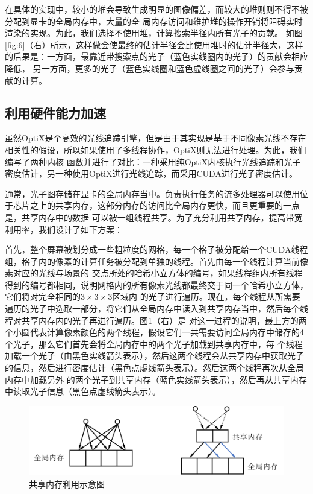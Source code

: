 \documentclass[UTF8]{ctexart}
\begin{document}
        在具体的实现中，较小的堆会导致生成明显的图像偏差，而较大的堆则则不得不被分配到显卡的全局内存中，大量的全
        局内存访问和维护堆的操作开销将阻碍实时渲染的实现。为此，我们选择不使用堆，计算搜索半径内所有光子的贡献。
        如图\ref{fig:6}（右）所示，这样做会使最终的估计半径会比使用堆时的估计半径大，这样的后果是：一方面，最靠近带搜索点的光子（蓝色实线圈内的光子）的贡献会相应降低，
        另一方面，更多的光子（蓝色实线圈和蓝色虚线圈之间的光子）会参与贡献的计算。

    \subsection{利用硬件能力加速}
        虽然OptiX是个高效的光线追踪引擎，但是由于其实现是基于不同像素光线不存在相关性的假设，所以如果使用了多线程协作，OptiX则无法进行处理。为此，我们编写了两种内核
        函数并进行了对比：一种采用纯OptiX内核执行光线追踪和光子密度估计，另一种使用OptiX进行光线追踪，而采用CUDA进行光子密度估计。
        
        通常，光子图存储在显卡的全局内存当中。负责执行任务的流多处理器可以使用位于芯片之上的共享内存，这部分内存的访问比全局内存更快，而且更重要的一点是，共享内存中的数据
        可以被一组线程共享。为了充分利用共享内存，提高带宽利用率，我们设计了如下方案：
        
        首先，整个屏幕被划分成一些粗粒度的网格，每一个格子被分配给一个CUDA线程组，格子内的像素的计算任务被分配到单独的线程。首先由每一个线程计算当前像素对应的光线与场景的
        交点所处的哈希小立方体的编号，如果线程组内所有线程得到的编号都相同，说明网格内的所有像素光线都最终交于同一个哈希小立方体，它们将对完全相同的$3\times3\times3$区域内
        的光子进行遍历。现在，每个线程从所需要遍历的光子中选取一部分，将它们从全局内存中读入到共享内存当中，然后每个线程对共享内存内的光子再进行遍历。图\ref{fig:5}（右）是
        对这一过程的说明，最上方的两个小圆代表计算像素颜色的两个线程，假设它们一共需要访问全局内存中储存的4个光子，那么它们首先会将全局内存中的两个光子加载到共享内存中，每
        个线程加载一个光子（由黑色实线箭头表示），然后这两个线程会从共享内存中获取光子的信息，然后进行密度估计（黑色点虚线箭头表示）。然后这两个线程再次从全局内存中加载另外
        的两个光子到共享内存（蓝色实线箭头表示），然后再从共享内存中读取光子信息（黑色点虚线箭头表示）。
        
        \begin{figure}[htbp]
        \centering
        \includegraphics[scale=0.7]{pic/SharedMemory.png}
        \caption{共享内存利用示意图}
        \label{fig:5}
        \end{figure}
        
\end{document}
